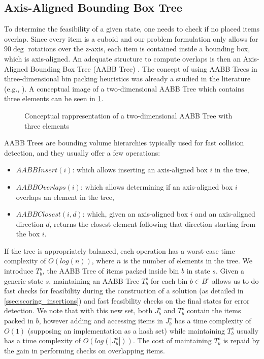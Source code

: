 \subsection{Axis-Aligned Bounding Box Tree}
\label{sec:problem_state:aabbtree}%

To determine the feasibility of a given state, one needs to check if no placed items overlap.
Since every item is a cuboid and our problem formulation only allows for $90\deg$ rotations over the z-axis, each item is contained inside a bounding box, which is axis-aligned.
An adequate structure to compute overlaps is then an Axis-Aligned Bounding Box Tree (AABB Tree) \citep{bergen1997efficient}.
The concept of using AABB Trees in three-dimensional bin packing heuristics was already a studied in the literature (e.g., \cite{ALLEN2011219}).
A conceptual image of a two-dimensional AABB Tree which contains three elements can be seen in \cref{fig:aabb_tree}.

\begin{figure}
    \label{fig:aabb_tree}%
    
    \caption{Conceptual rappresentation of a two-dimensional AABB Tree with three elements}
\end{figure}

AABB Trees are bounding volume hierarchies typically used for fast collision detection, and they usually offer a few operations:
\begin{itemize}
    \item $AABBInsert(i)$: which allows inserting an axis-aligned box $i$ in the tree,
    \item $AABBOverlaps(i)$: which allows determining if an axis-aligned box $i$ overlaps an element in the tree,
    \item $AABBClosest(i, d)$: which, given an axis-aligned box $i$ and an axis-aligned direction $d$, returns the closest element following that direction starting from the box $i$.
\end{itemize}

If the tree is appropriately balanced, each operation has a worst-case time complexity of $O(log(n))$, where $n$ is the number of elements in the tree.
We introduce $T^s_b$, the AABB Tree of items packed inside bin $b$ in state $s$.
Given a generic state $s$, maintaining an AABB Tree $T^s_b$ for each bin $b \in B^s$ allows us to do fast checks for feasibility during the construction of a solution (as detailed in \ref{ssec:scoring_insertions}) and fast feasibility checks on the final states for error detection.
We note that with this new set, both $J^s_b$ and $T^s_b$ contain the items packed in $b$, however adding and accessing items in $J^s_b$ has a time complexity of $O(1)$ (supposing an implementation as a hash set) while maintaining $T^s_b$ usually has a time complexity of $O(log(|J^s_b|))$.
The cost of maintaining $T^s_b$ is repaid by the gain in performing checks on overlapping items.

